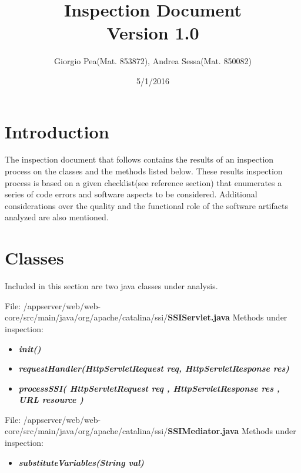 \documentclass[11pt,titlepage]{article} %
\title{Inspection Document \\ \vspace{1cm} \large{Version 1.0}}
\author{Giorgio Pea(Mat. 853872), Andrea Sessa(Mat. 850082)}
\date{5/1/2016}
\begin{document}
\maketitle

\newpage

\tableofcontents

\newpage

\section{Introduction}
  The inspection document that follows contains the results of an inspection process on
  the classes and the methods listed below.\newline
  These results inspection process is based on a given checklist(see reference section) that enumerates a series of
  code errors and software aspects to be considered. Additional considerations over the quality and the functional 
  role of the software artifacts analyzed are also mentioned. 

\section{Classes}

Included in this section are two java classes under analysis.\newline

\noindent File: /appserver/web/web-core/src/main/java/org/apache/catalina/ssi/\textbf{SSIServlet.java}\newline\newline
Methods under inspection:
  \begin{itemize}
    \item \textbf{\textit{init()}}
    \item \textbf{\textit{requestHandler(HttpServletRequest req, HttpServletResponse res)}}
    \item \textbf{\textit{processSSI( HttpServletRequest req , HttpServletResponse res , URL resource )}}
  \end{itemize}

\noindent File: /appserver/web/web-core/src/main/java/org/apache/catalina/ssi/\textbf{SSIMediator.java}\newline\newline
Methods under inspection:
  \begin{itemize}
    \item \textbf{\textit{substituteVariables(String val)}}
  \end{itemize}
  
\end{document}
